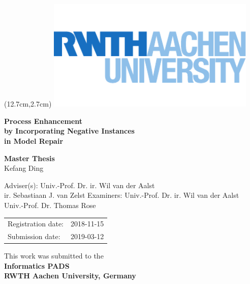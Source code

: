 
\titlehead{
} %


\begin{titlepage}

\begin{textblock*}{10cm} (12.7cm,2.7cm)
\includegraphics[width=10cm,keepaspectratio]{logos/rwth}
\end{textblock*}

\let\footnotesize\small \let\footnoterule\relax

\hbox{}
\vfill

\centering

\begin{doublespace} 
{ \huge\sffamily\textbf{Process Enhancement \\  \vspace{-0.5em} by Incorporating Negative Instances \\ in Model Repair \\  \vspace{-0.7em}
}}
\end{doublespace}
\vskip 2cm

{\large\sffamily

\textbf{Master Thesis}\\[12pt]
\vskip 6mm
Kefang Ding
\vskip 1cm

Adviser(s):
\vskip 2mm
Univ.-Prof. Dr. ir. Wil van der Aalst\\
ir. Sebastiaan J. van Zelst
\vskip 5mm
Examiners:
\vskip 2mm
Univ.-Prof. Dr. ir. Wil van der Aalst\\
Univ.-Prof. Dr. Thomas Rose
\vskip 1cm

\begin{tabular}{R{6cm}p{6cm}}
Registration date:  & 2018-11-15 \\
Submission date:    & 2019-03-12 \\
\end{tabular}
\vskip 1cm
This work was submitted to the\\[5pt]
\textbf{Informatics PADS\\[5pt]
	RWTH Aachen University, Germany}
\vskip 2cm

} %

\vfill

\end{titlepage}
